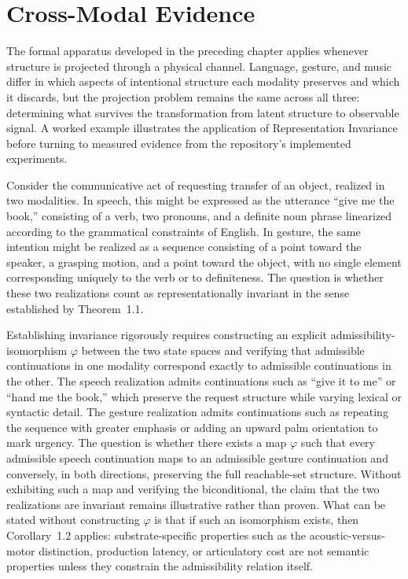 \chapter{Cross-Modal Evidence}
\label{ch:essay-crossmodal}

The formal apparatus developed in the preceding chapter applies whenever structure is projected through a physical channel. Language, gesture, and music differ in which aspects of intentional structure each modality preserves and which it discards, but the projection problem remains the same across all three: determining what survives the transformation from latent structure to observable signal. A worked example illustrates the application of Representation Invariance before turning to measured evidence from the repository's implemented experiments.

Consider the communicative act of requesting transfer of an object, realized in two modalities. In speech, this might be expressed as the utterance ``give me the book,'' consisting of a verb, two pronouns, and a definite noun phrase linearized according to the grammatical constraints of English. In gesture, the same intention might be realized as a sequence consisting of a point toward the speaker, a grasping motion, and a point toward the object, with no single element corresponding uniquely to the verb or to definiteness. The question is whether these two realizations count as representationally invariant in the sense established by Theorem~1.1.

Establishing invariance rigorously requires constructing an explicit admissibility-isomorphism $\varphi$ between the two state spaces and verifying that admissible continuations in one modality correspond exactly to admissible continuations in the other. The speech realization admits continuations such as ``give it to me'' or ``hand me the book,'' which preserve the request structure while varying lexical or syntactic detail. The gesture realization admits continuations such as repeating the sequence with greater emphasis or adding an upward palm orientation to mark urgency. The question is whether there exists a map $\varphi$ such that every admissible speech continuation maps to an admissible gesture continuation and conversely, in both directions, preserving the full reachable-set structure. Without exhibiting such a map and verifying the biconditional, the claim that the two realizations are invariant remains illustrative rather than proven. What can be stated without constructing $\varphi$ is that if such an isomorphism exists, then Corollary~1.2 applies: substrate-specific properties such as the acoustic-versus-motor distinction, production latency, or articulatory cost are not semantic properties unless they constrain the admissibility relation itself.

